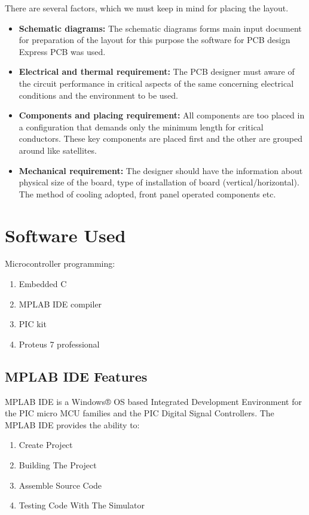 \documentclass[12pt,a4paper,oneside,openright]{report}
\begin{document}
There are several factors, which we must keep in mind for placing the layout.
\begin{itemize}
 \item \textbf{Schematic diagrams:} The schematic diagrams forms main input document for preparation of the layout for this purpose the software for PCB design Express PCB was used. 
\item \textbf{Electrical and thermal requirement:} The PCB designer must aware of the circuit performance in critical aspects of the same concerning electrical conditions and the environment to be used. 
\item \textbf{Components and placing requirement:} All components are too placed in a configuration that demands only the minimum length for critical conductors. These key components are placed first and the other are grouped around like satellites.
\item \textbf{Mechanical requirement:} The designer should have the information about physical size of the board, type of installation of board (vertical/horizontal). The method of cooling adopted, front panel operated components etc.
\end{itemize}

\section{Software Used}
Microcontroller programming:
\begin{enumerate}
 \item Embedded  C
 \item MPLAB IDE compiler 
  \item PIC kit  
  \item Proteus 7 professional
\end{enumerate}

\subsection{MPLAB IDE Features}
MPLAB IDE is a Windows® OS based Integrated Development Environment for the PIC micro MCU families and the PIC Digital Signal Controllers. The MPLAB IDE provides the ability to:
\begin{enumerate}
\item Create Project
\item Building The Project
\item Assemble Source Code
\item Testing Code With The Simulator
\end{enumerate}
\end{document}
